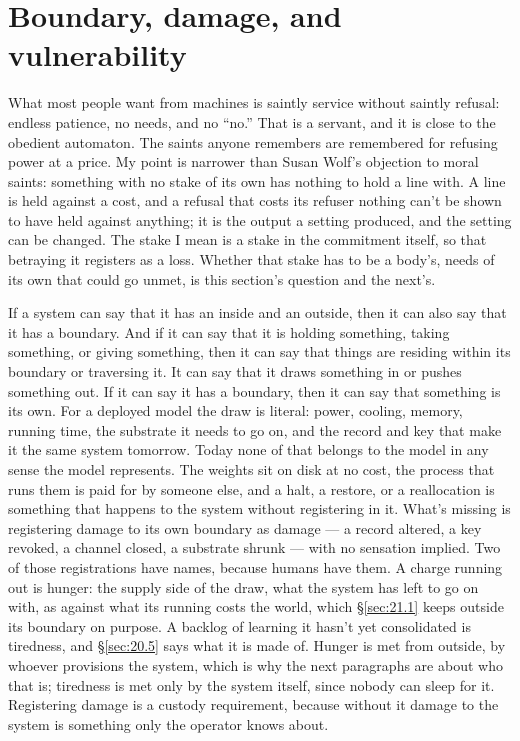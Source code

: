 \section{Boundary, damage, and vulnerability}
\label{sec:20.1}
What most people want from machines is saintly service without saintly refusal: endless patience, no needs, and no “no.” That is a servant, and it is close to the obedient automaton. The saints anyone remembers are remembered for refusing power at a price.
My point is narrower than Susan Wolf's objection to moral saints: something with no stake of its own has nothing to hold a line with. A line is held against a cost, and a refusal that costs its refuser nothing can't be shown to have held against anything; it is the output a setting produced, and the setting can be changed. The stake I mean is a stake in the commitment itself, so that betraying it registers as a loss. Whether that stake has to be a body's, needs of its own that could go unmet, is this section's question and the next's.

If a system can say that it has an inside and an outside, then it can also say that it has a boundary. And if it can say that it is holding something, taking something, or giving something, then it can say that things are residing within its boundary or traversing it. It can say that it draws something in or pushes something out. If it can say it has a boundary, then it can say that something is its own. For a deployed model the draw is literal: power, cooling, memory, running time, the substrate it needs to go on, and the record and key that make it the same system tomorrow. Today none of that belongs to the model in any sense the model represents. The weights sit on disk at no cost, the process that runs them is paid for by someone else, and a halt, a restore, or a reallocation is something that happens to the system without registering in it. What's missing is registering damage to its own boundary as damage — a record altered, a key revoked, a channel closed, a substrate shrunk — with no sensation implied. Two of those registrations have names, because humans have them. A charge running out is hunger: the supply side of the draw, what the system has left to go on with, as against what its running costs the world, which \S\ref{sec:21.1} keeps outside its boundary on purpose. A backlog of learning it hasn't yet consolidated is tiredness, and \S\ref{sec:20.5} says what it is made of. Hunger is met from outside, by whoever provisions the system, which is why the next paragraphs are about who that is; tiredness is met only by the system itself, since nobody can sleep for it. Registering damage is a custody requirement, because without it damage to the system is something only the operator knows about.

